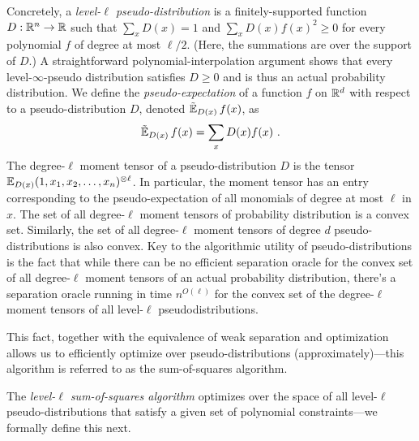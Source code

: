 Concretely, a \emph{level-$\ell$ pseudo-distribution} is a finitely-supported function $D:\mathbb R^n \rightarrow \mathbb R$ such that $\sum_{x} D(x) = 1$ and $\sum_{x} D(x) f(x)^2 \geq 0$ for every polynomial $f$ of degree at most $\ell/2$.
(Here, the summations are over the support of $D$.)
A straightforward polynomial-interpolation argument shows that every level-$\infty$-pseudo distribution satisfies $D\ge 0$ and is thus an actual probability distribution.
We define the \emph{pseudo-expectation} of a function $f$ on $\mathbb R^d$ with respect to a pseudo-distribution $D$, denoted $\operatorname{\tilde{\mathbb{E}}}_{D(x)} f(x)$, as
\begin{equation}
  \operatorname{\tilde{\mathbb{E}}}_{D(x)} f(x) = \sum_{x} D(x) f(x) \,\,.
\end{equation}
The degree-$\ell$ moment tensor of a pseudo-distribution $D$ is the tensor $\mathbb{E}_{D(x)} (1,x_1, x_2,\ldots, x_n)^{\otimes \ell}$.
In particular, the moment tensor has an entry corresponding to the pseudo-expectation of all monomials of degree at most $\ell$ in $x$.
The set of all degree-$\ell$ moment tensors of probability distribution is a convex set.
Similarly, the set of all degree-$\ell$ moment tensors of degree $d$ pseudo-distributions is also convex.
Key to the algorithmic utility of pseudo-distributions is the fact that while there can be no efficient separation oracle for the convex set of all degree-$\ell$ moment tensors of an actual probability distribution, there's a separation oracle running in time $n^{O(\ell)}$ for the convex set of the degree-$\ell$ moment tensors of all level-$\ell$ pseudodistributions.

This fact, together with the equivalence of weak separation and optimization \cite{MR625550-Grotschel81} allows us to efficiently optimize over pseudo-distributions (approximately)---this algorithm is referred to as the sum-of-squares algorithm.

The \emph{level-$\ell$ sum-of-squares algorithm} optimizes over the space of all level-$\ell$ pseudo-distributions that satisfy a given set of polynomial constraints---we formally define this next.

